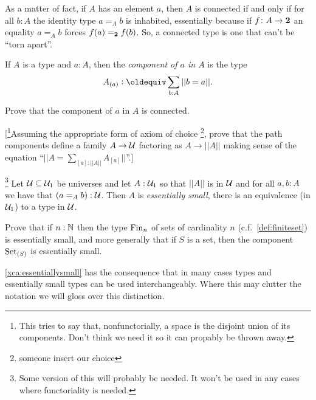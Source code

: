  As a matter of fact, if $A$ has an element $a$, then $A$ is connected if and only if for all $b:A$ the identity type $a=_Ab$ is inhabited, essentially because if $f\colon A\to\mathbf{2} $ an equality $a=_Ab$ forces $f(a)=_{\mathbf{2} }f(b)$.  So, a connected type is one that can't be ``torn apart''.  
\begin{definition}
    If $A$ is a type and $a:A$, then the \emph{component of $a$ in $A$} is the type
$$A_{(a)}\defequi \sum_{b:A}||b=a||.$$
\end{definition}
\begin{xca}
  Prove that the component of $a$ in $A$ is connected.  

 [\footnote{This tries to say that, nonfunctorially, a space is the disjoint union of its components.  Don't think we need it so it can propably be thrown away.}Assuming the appropriate form of axiom of choice \footnote{someone insert our choice}, prove that the path components define a family $A\to\mathcal{U}$ factoring as $A\to||A||$ making sense of the equation ``$||A=\sum_{[a]:||A||}A_{[a]}||$''.]
\end{xca}
\begin{xca}\label{xca:essentiallysmall} \footnote{Some version of this will probably be needed.  It won't be used in any cases where functoriality is needed.}
  Let $\mathcal{U}\subseteq\mathcal{U}_1$ be universes and let $A:\mathcal{U}_1$ so that $||A||$ is in $\mathcal{U}$ and for all $a,b:A$ we have that $(a=_Ab):\mathcal{U}$.  Then $A$ is \emph{essentially small}, \ie there is an equivalence (in $\mathcal{U}_1$) to a type in $\mathcal{U}$.  

Prove that if $n:\mathbb{N}$ then the type $\operatorname{Fin}_n$ of sets of cardinality $n$  (c.f.~\cref{def:finiteset}) is essentially small, and more generally that if $S$ is a set, then the component $\mathord{\mathrm{Set}}_{(S)}$ is essentially small.  
\end{xca}
\cref{xca:essentiallysmall} has the consequence that in many cases types and essentially small types can be used interchangeably.  Where this may clutter the notation we will gloss over this distinction.

